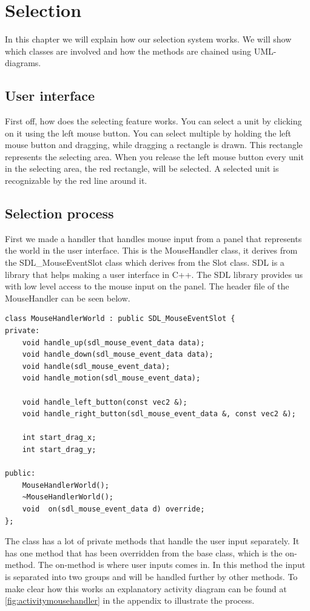 \section{Selection}
In this chapter we will explain how our selection system works. We will show which classes are involved and how the methods are chained using UML-diagrams. 

\subsection{User interface}
First off, how does the selecting feature works. You can select a unit by clicking on it using the left mouse button. You can select multiple by holding the left mouse button and dragging, while dragging a rectangle is drawn. This rectangle represents the selecting area. When you release the left mouse button every unit in the selecting area, the red rectangle, will be selected. A selected unit is recognizable by the red line around it.

\subsection{Selection process}
First we made a handler that handles mouse input from a panel that represents the world in the user interface. This is the MouseHandler class, it derives from the SDL\_MouseEventSlot class which derives from the Slot class. SDL is a library that helps making a user interface in C++. The SDL library provides us with low level access to the mouse input on the panel. The header file of the MouseHandler can be seen below.

\begin{lstlisting}
class MouseHandlerWorld : public SDL_MouseEventSlot {
private:
    void handle_up(sdl_mouse_event_data data);
    void handle_down(sdl_mouse_event_data data);
    void handle(sdl_mouse_event_data);
    void handle_motion(sdl_mouse_event_data);

    void handle_left_button(const vec2 &);
    void handle_right_button(sdl_mouse_event_data &, const vec2 &);

    int start_drag_x;
    int start_drag_y;

public:
    MouseHandlerWorld();
    ~MouseHandlerWorld();
    void  on(sdl_mouse_event_data d) override;
};
\end{lstlisting}

The class has a lot of private methods that handle the user input separately. It has one method that has been overridden from the base class, which is the on-method. The on-method is where user inputs comes in. In this method the input is separated into two groups and will be handled further by other methods. To make clear how this works an explanatory activity diagram can be found at \cref{fig:activitymousehandler} in the appendix to illustrate the process. 

